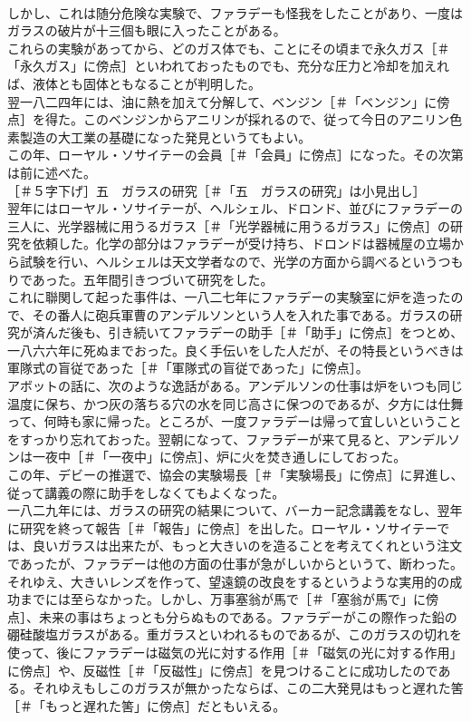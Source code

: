 \documentclass[8pt]{extreport}
\begin{document}
\begin{CJK}{UTF8}{min}
\\	しかし、これは随分危険な実験で、ファラデーも怪我をしたことがあり、一度はガラスの破片が十三個も眼に入ったことがある。
\\	これらの実験があってから、どのガス体でも、ことにその頃まで永久ガス［＃「永久ガス」に傍点］といわれておったものでも、充分な圧力と冷却を加えれば、液体とも固体ともなることが判明した。
\\	翌一八二四年には、油に熱を加えて分解して、ベンジン［＃「ベンジン」に傍点］を得た。このベンジンからアニリンが採れるので、従って今日のアニリン色素製造の大工業の基礎になった発見というてもよい。
\\	この年、ローヤル・ソサイテーの会員［＃「会員」に傍点］になった。その次第は前に述べた。
\\	［＃５字下げ］五　ガラスの研究［＃「五　ガラスの研究」は小見出し］
\\	翌年にはローヤル・ソサイテーが、ヘルシェル、ドロンド、並びにファラデーの三人に、光学器械に用うるガラス［＃「光学器械に用うるガラス」に傍点］の研究を依頼した。化学の部分はファラデーが受け持ち、ドロンドは器械屋の立場から試験を行い、ヘルシェルは天文学者なので、光学の方面から調べるというつもりであった。五年間引きつづいて研究をした。
\\	これに聯関して起った事件は、一八二七年にファラデーの実験室に炉を造ったので、その番人に砲兵軍曹のアンデルソンという人を入れた事である。ガラスの研究が済んだ後も、引き続いてファラデーの助手［＃「助手」に傍点］をつとめ、一八六六年に死ぬまでおった。良く手伝いをした人だが、その特長というべきは軍隊式の盲従であった［＃「軍隊式の盲従であった」に傍点］。
\\	アボットの話に、次のような逸話がある。アンデルソンの仕事は炉をいつも同じ温度に保ち、かつ灰の落ちる穴の水を同じ高さに保つのであるが、夕方には仕舞って、何時も家に帰った。ところが、一度ファラデーは帰って宜しいということをすっかり忘れておった。翌朝になって、ファラデーが来て見ると、アンデルソンは一夜中［＃「一夜中」に傍点］、炉に火を焚き通しにしておった。
\\	この年、デビーの推選で、協会の実験場長［＃「実験場長」に傍点］に昇進し、従って講義の際に助手をしなくてもよくなった。
\\	一八二九年には、ガラスの研究の結果について、バーカー記念講義をなし、翌年に研究を終って報告［＃「報告」に傍点］を出した。ローヤル・ソサイテーでは、良いガラスは出来たが、もっと大きいのを造ることを考えてくれという注文であったが、ファラデーは他の方面の仕事が急がしいからというて、断わった。それゆえ、大きいレンズを作って、望遠鏡の改良をするというような実用的の成功までには至らなかった。しかし、万事塞翁が馬で［＃「塞翁が馬で」に傍点］、未来の事はちょっとも分らぬものである。ファラデーがこの際作った鉛の硼硅酸塩ガラスがある。重ガラスといわれるものであるが、このガラスの切れを使って、後にファラデーは磁気の光に対する作用［＃「磁気の光に対する作用」に傍点］や、反磁性［＃「反磁性」に傍点］を見つけることに成功したのである。それゆえもしこのガラスが無かったならば、この二大発見はもっと遅れた筈［＃「もっと遅れた筈」に傍点］だともいえる。

\end{CJK}
\end{document}
